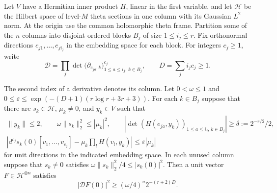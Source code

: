 \begin{auxlemma}
\label{lem:light-block-jet-product}
Let \(V\) have a Hermitian inner product \(H\), linear in the first
variable, and let \(\mathcal H\) be the Hilbert space of level-\(M\)
theta sections in one column with its Gaussian \(L^2\) norm. At the
origin use the common holomorphic theta frame. Partition some of the
\(n\) columns into disjoint ordered blocks \(B_j\) of size
\(1\le i_j\le r\). Fix orthonormal directions
\(e_{j1},\ldots,e_{ji_j}\) in the embedding space for each block.
For integers \(c_j\ge1\), write
\[
 \mathcal D=\prod_j
   \det\bigl(\partial_{e_{ja},k}\bigr)_{1\le a\le i_j,\,k\in B_j}^{c_j},
 \qquad D=\sum_j i_jc_j\ge1 .
\]

The second index of a derivative denotes its column. Let \(0<\omega\le1\)
and \(0\le\varepsilon\le\exp(-(D+1)(r\log r+3r+3))\).
For each \(k\in B_j\) suppose that there are
\(s_k\in\mathcal H\), \(\mu_k\ne0\), and \(y_k\in V\) such that
\begin{gather}
 \label{eq:light-single-column}
 \|y_k\|\le2,\qquad
 \omega\|s_k\|_2^2\le|\mu_k|^2,\qquad
 \left|\det(H(e_{ja},y_k))_{1\le a\le i_j,\,k\in B_j}\right|
       \ge\delta:=2^{-r/2}/2,\\
 \label{eq:light-single-column-derivative}
 \left|d^{c_j}s_k(0)[v_1,\ldots,v_{c_j}]
       -\mu_k\prod_l H(v_l,y_k)\right|\le\varepsilon|\mu_k|
\end{gather}
for unit directions in the indicated embedding space. In each unused
column suppose that \(s_k\ne0\) satisfies
\(\omega\|s_k\|_2^2/4\le|s_k(0)|^2\).
Then a unit vector \(F\in\mathcal H^{\otimes n}\) satisfies
\[
 |\mathcal D F(0)|^2\ge (\omega/4)^n 2^{-(r+2)D}.
\]
\end{auxlemma}
